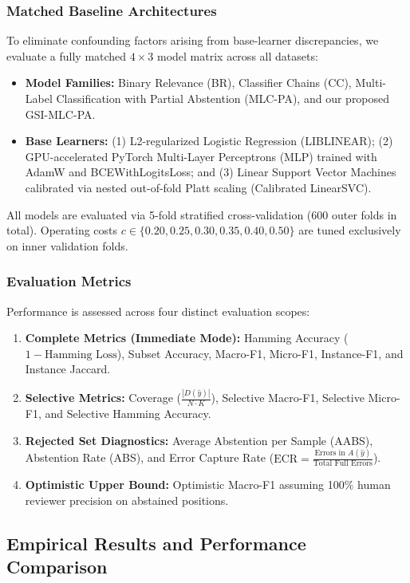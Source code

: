 \documentclass[conference]{IEEEtran}
\begin{document}
\subsubsection{Matched Baseline Architectures}
To eliminate confounding factors arising from base-learner discrepancies, we evaluate a fully matched $4 \times 3$ model matrix across all datasets:
\begin{itemize}
    \item \textbf{Model Families:} Binary Relevance (BR), Classifier Chains (CC), Multi-Label Classification with Partial Abstention (MLC-PA), and our proposed GSI-MLC-PA.
    \item \textbf{Base Learners:} (1) L2-regularized Logistic Regression (LIBLINEAR); (2) GPU-accelerated PyTorch Multi-Layer Perceptrons (MLP) trained with AdamW and BCEWithLogitsLoss; and (3) Linear Support Vector Machines calibrated via nested out-of-fold Platt scaling (Calibrated LinearSVC).
\end{itemize}
All models are evaluated via 5-fold stratified cross-validation (600 outer folds in total). Operating costs $c \in \{0.20, 0.25, 0.30, 0.35, 0.40, 0.50\}$ are tuned exclusively on inner validation folds.

\subsubsection{Evaluation Metrics}
Performance is assessed across four distinct evaluation scopes:
\begin{enumerate}
    \item \textbf{Complete Metrics (Immediate Mode):} Hamming Accuracy ($1 - \text{Hamming Loss}$), Subset Accuracy, Macro-F1, Micro-F1, Instance-F1, and Instance Jaccard.
    \item \textbf{Selective Metrics:} Coverage ($\frac{|D(\hat{y})|}{N \cdot K}$), Selective Macro-F1, Selective Micro-F1, and Selective Hamming Accuracy.
    \item \textbf{Rejected Set Diagnostics:} Average Abstention per Sample (AABS), Abstention Rate (ABS), and Error Capture Rate ($\text{ECR} = \frac{\text{Errors in } A(\hat{y})}{\text{Total Full Errors}}$).
    \item \textbf{Optimistic Upper Bound:} Optimistic Macro-F1 assuming 100\% human reviewer precision on abstained positions.
\end{enumerate}

\subsection{Empirical Results and Performance Comparison}
\end{document}
